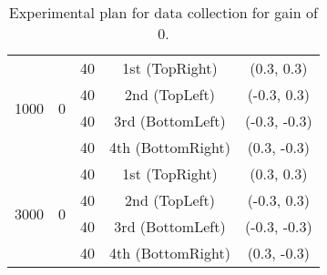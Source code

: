 \begin{table}[ht]
{\begin{tabular}{ccccc}
                    \midrule

                    \multirow{4}{*}{1000} & \multirow{4}{*}{0} & 40 & 1st (\textsf{TopRight}) & (0.3, 0.3) \\
                    & & 40 & 2nd (\textsf{TopLeft}) & (-0.3, 0.3) \\
                    & & 40 & 3rd (\textsf{BottomLeft}) & (-0.3, -0.3) \\
                    & & 40 & 4th (\textsf{BottomRight}) & (0.3, -0.3) \\

                    \midrule

                    \multirow{4}{*}{3000} & \multirow{4}{*}{0} & 40 & 1st (\textsf{TopRight}) & (0.3, 0.3) \\
                    & & 40 & 2nd (\textsf{TopLeft}) & (-0.3, 0.3) \\
                    & & 40 & 3rd (\textsf{BottomLeft}) & (-0.3, -0.3) \\
                    & & 40 & 4th (\textsf{BottomRight}) & (0.3, -0.3) \\
                    \bottomrule
                \end{tabular}
                }
                \caption{Experimental plan for data collection for gain of 0.}
                \label{table:exp_plan_exposure_time}
            \end{table}

